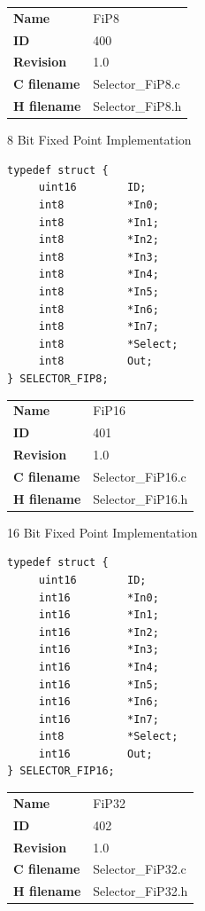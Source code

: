 \nopagebreak[0]
\begin{tabular}{l l}
\textbf{Name} & FiP8 \tabularnewline
\textbf{ID} & 400 \tabularnewline
\textbf{Revision} & 1.0 \tabularnewline
\textbf{C filename} & Selector\_FiP8.c \tabularnewline
\textbf{H filename} & Selector\_FiP8.h \tabularnewline
\end{tabular}
\vspace{1ex}

8 Bit Fixed Point Implementation

\begin{lstlisting}
typedef struct {
     uint16        ID;
     int8          *In0;
     int8          *In1;
     int8          *In2;
     int8          *In3;
     int8          *In4;
     int8          *In5;
     int8          *In6;
     int8          *In7;
     int8          *Select;
     int8          Out;
} SELECTOR_FIP8;
\end{lstlisting}

\ifdefined \AddTestReports
{}
\fi
{}
\nopagebreak[0]
\begin{tabular}{l l}
\textbf{Name} & FiP16 \tabularnewline
\textbf{ID} & 401 \tabularnewline
\textbf{Revision} & 1.0 \tabularnewline
\textbf{C filename} & Selector\_FiP16.c \tabularnewline
\textbf{H filename} & Selector\_FiP16.h \tabularnewline
\end{tabular}
\vspace{1ex}

16 Bit Fixed Point Implementation

\begin{lstlisting}
typedef struct {
     uint16        ID;
     int16         *In0;
     int16         *In1;
     int16         *In2;
     int16         *In3;
     int16         *In4;
     int16         *In5;
     int16         *In6;
     int16         *In7;
     int8          *Select;
     int16         Out;
} SELECTOR_FIP16;
\end{lstlisting}

\ifdefined \AddTestReports
{}
\fi
{}
\nopagebreak[0]
\begin{tabular}{l l}
\textbf{Name} & FiP32 \tabularnewline
\textbf{ID} & 402 \tabularnewline
\textbf{Revision} & 1.0 \tabularnewline
\textbf{C filename} & Selector\_FiP32.c \tabularnewline
\textbf{H filename} & Selector\_FiP32.h \tabularnewline
\end{tabular}
\vspace{1ex}

